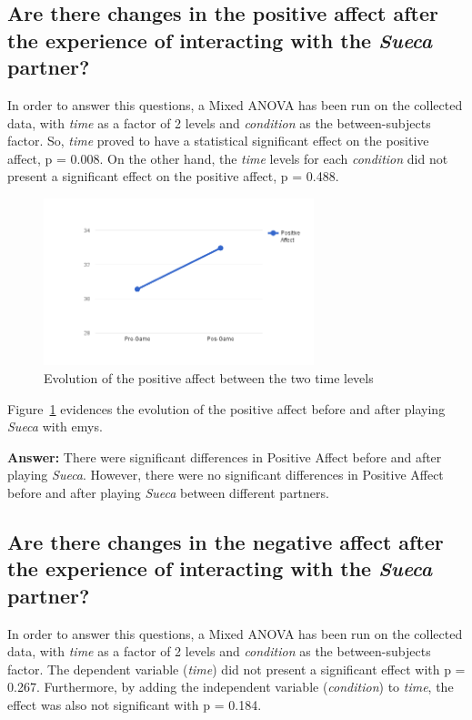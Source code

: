 \subsection*{Are there changes in the positive affect after the experience of interacting with the \emph{Sueca} partner?}
In order to answer this questions, a Mixed ANOVA has been run on the collected data, with \emph{time} as a factor of 2 levels and \emph{condition} as the between-subjects factor.
So, \emph{time} proved to have a statistical significant effect on the positive affect, p = 0.008.
On the other hand, the \emph{time} levels for each \emph{condition} did not present a significant effect on the positive affect, p = 0.488.

\begin{figure}[h!]
  \centering
    \includegraphics[width=0.7\textwidth]{./img/7/positiveAffect}
  \caption{Evolution of the positive affect between the two time levels}
\label{fig:positiveAffect}
\end{figure}

Figure~\ref{fig:positiveAffect} evidences the evolution of the positive affect before and after playing \emph{Sueca} with \ac{emys}.

\textbf{Answer:} There were significant differences in Positive Affect before and after playing \emph{Sueca}.
However, there were no significant differences in Positive Affect before and after playing \emph{Sueca} between different partners.

\subsection*{Are there changes in the negative affect after the experience of interacting with the \emph{Sueca} partner?}
In order to answer this questions, a Mixed ANOVA has been run on the collected data, with \emph{time} as a factor of 2 levels and \emph{condition} as the between-subjects factor.
The dependent variable (\emph{time}) did not present a significant effect with p = 0.267.
Furthermore, by adding the independent variable (\emph{condition}) to \emph{time}, the effect was also not significant with p = 0.184.

